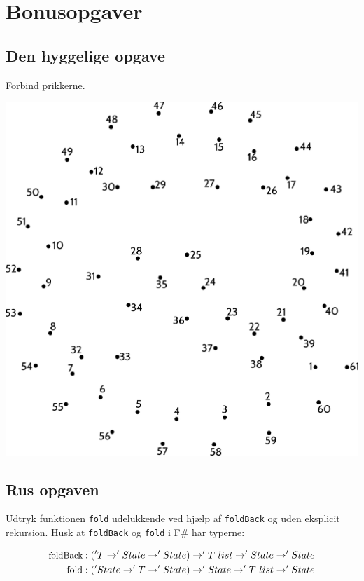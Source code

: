 \section{\huge{Bonusopgaver}}

\subsection{Den hyggelige opgave}

Forbind prikkerne.

\begin{center}
\includegraphics[width=.99\textwidth]{forbind-prikkerne.pdf}
\end{center}


\newpage
\subsection{Rus opgaven}
Udtryk funktionen \texttt{fold} udelukkende ved hjælp af
\texttt{foldBack} og uden eksplicit rekursion.
Husk at \texttt{foldBack} og \texttt{fold} i F\# har typerne:

\begin{align*}\small
  \text{foldBack} &: ('T \rightarrow 'State \rightarrow 'State) \rightarrow 'T\ list \rightarrow 'State \rightarrow 'State\\
  \text{fold} &: ('State \rightarrow 'T \rightarrow 'State) \rightarrow 'State \rightarrow 'T\ list \rightarrow 'State
\end{align*}

